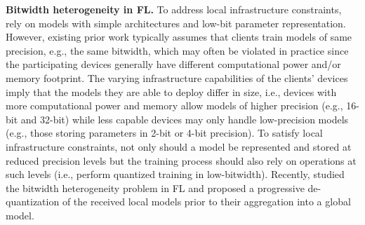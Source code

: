 {\bf Bitwidth heterogeneity in FL.} To address local infrastructure constraints, \cite{diao2020heterofl} rely
on models with simple architectures and low-bit parameter representation. However, existing prior work
typically assumes that clients train models of same precision, e.g., the same bitwidth, which may often
be violated in practice since the participating devices generally have different computational power and/or memory 
footprint. The varying infrastructure capabilities of the clients' devices imply that the models they are able to 
deploy differ in size, i.e., devices with more computational power and memory allow models of higher 
precision (e.g., 16-bit and 32-bit) while less capable devices may only handle low-precision models (e.g.,
those storing parameters in 2-bit or 4-bit precision). To satisfy local infrastructure constraints, not only should 
a model be represented and stored at reduced precision levels but the training process should also rely on 
operations at such levels (i.e., perform quantized training in low-bitwidth). Recently, \cite{yoon2022bitwidth} 
studied the bitwidth heterogeneity problem in FL and proposed a progressive de-quantization of the received
local models prior to their aggregation into a global model.

